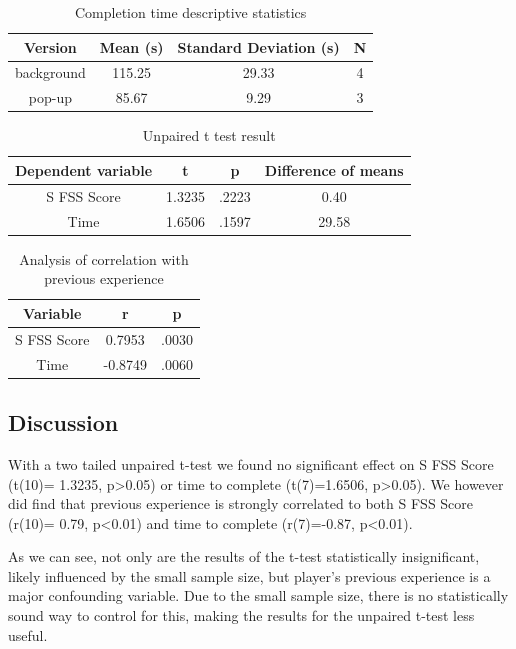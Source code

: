 \documentclass{acmsiggraph}
\begin{document}
\begin{table}[h]
  \centering
  \caption{Completion time descriptive statistics}
  \label{time}
  \begin{tabular}{|c|c|c|c|}
  	\hline
  	\textbf{Version} & \textbf{Mean (s)} & \textbf{Standard Deviation (s)} & \textbf{N}\\
    \hline
    background & 115.25 & 29.33 & 4 \\
	pop-up & 85.67 & 9.29 & 3 \\
    \hline
  \end{tabular}
\end{table}

\begin{table}[h]
  \centering
  \caption{Unpaired t test result}
  \label{ttest}
  \begin{tabular}{|c|c|c|c|}
  	\hline
  	\textbf{Dependent variable} &\textbf{t}  &\textbf{p} & \textbf{Difference of means}\\
    \hline
    S FSS Score & 1.3235 & .2223 & 0.40 \\
    Time & 1.6506 & .1597 & 29.58\\
    \hline
  \end{tabular}
\end{table}

\begin{table}[!h]
  \centering
  \caption{Analysis of correlation with previous experience}
  \label{corr}
  \begin{tabular}{|c|c|c|}
  	\hline
  	\textbf{Variable} &\textbf{r} & \textbf{p}\\
    \hline
    S FSS Score & 0.7953 & .0030 \\
    Time & -0.8749 & .0060\\
    \hline
  \end{tabular}
\end{table}

\subsection{Discussion}
With a two tailed unpaired t-test we found no significant effect on S FSS Score (t(10)= 1.3235, p\textgreater  0.05) or time to complete (t(7)=1.6506, p\textgreater0.05). We however did find that previous experience is strongly correlated to both S FSS Score (r(10)= 0.79, p\textless0.01) and time to complete (r(7)=-0.87, p\textless0.01).

As we can see, not only are the results of the t-test statistically insignificant, likely influenced by the small sample size, but player's previous experience is a major confounding variable. Due to the small sample size, there is no statistically sound way to control for this, making the results for the unpaired t-test less useful.
 
\end{document}
